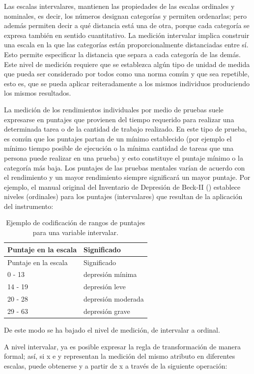 \documentclass[]{book}
\begin{document}
Las escalas intervalares, mantienen las propiedades de las escalas ordinales y nominales, es decir, los números designan categorías y permiten ordenarlas; pero además permiten decir a qué distancia está una de otra, porque cada categoría se expresa también en sentido cuantitativo. La medición intervalar implica construir una escala en la que las categorías están proporcionalmente distanciadas entre sí. Esto permite especificar la distancia que separa a cada categoría de las demás. Este nivel de medición requiere que se establezca algún tipo de unidad de medida que pueda ser considerado por todos como una norma común y que sea repetible, esto es, que se pueda aplicar reiteradamente a los mismos individuos produciendo los mismos resultados.

La medición de los rendimientos individuales por medio de pruebas suele expresarse en puntajes que provienen del tiempo requerido para realizar una determinada tarea o de la cantidad de trabajo realizado. En este tipo de prueba, es común que los puntajes partan de un mínimo establecido (por ejemplo el mínimo tiempo posible de ejecución o la mínima cantidad de tareas que una persona puede realizar en una prueba) y esto constituye el puntaje mínimo o la categoría más baja. Los puntajes de las pruebas mentales varían de acuerdo con el rendimiento y un mayor rendimiento siempre significará un mayor puntaje. Por ejemplo, el manual original del Inventario de Depresión de Beck-II (\citet{Upton2013}) establece niveles (ordinales) para los puntajes (intervalares) que resultan de la aplicación del instrumento:

\begin{longtable}[]{@{}ll@{}}
\caption{\label{tab:unnamed-chunk-31}Ejemplo de codificación de rangos de puntajes para una variable intervalar.}\tabularnewline
\toprule
Puntaje en la escala & Significado\tabularnewline
\midrule
\endfirsthead
\toprule
Puntaje en la escala & Significado\tabularnewline
\midrule
\endhead
0 - 13 & depresión mínima\tabularnewline
14 - 19 & depresión leve\tabularnewline
20 - 28 & depresión moderada\tabularnewline
29 - 63 & depresión grave\tabularnewline
\bottomrule
\end{longtable}

De este modo se ha bajado el nivel de medición, de intervalar a ordinal.

A nivel intervalar, ya es posible expresar la regla de transformación de manera formal; así, si x e y representan la medición del mismo atributo en diferentes escalas, puede obtenerse y a partir de x a través de la siguiente operación:
\end{document}

